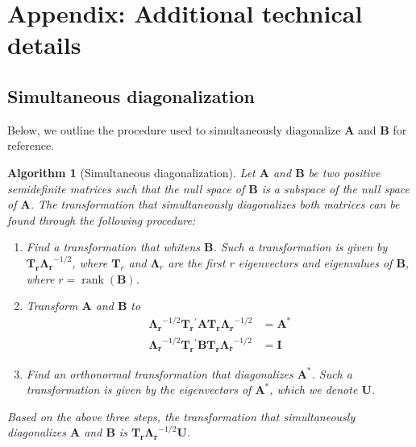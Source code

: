 \documentclass[12pt]{article} %
\newtheorem{algorithm}[theorem]{Algorithm}
\newcommand{\trans}{\ensuremath{^\prime}}
\DeclareMathOperator{\rank}{rank}
\begin{document}
\section{Appendix: Additional technical details}

\subsection{Simultaneous diagonalization}

Below, we outline the procedure used to simultaneously diagonalize $\bm{A}$ and $\bm{B}$ for reference.

\begin{algorithm}[Simultaneous diagonalization]
Let $\bm{A}$ and $\bm{B}$ be two positive semidefinite matrices such that the null space of $\bm{B}$ is a subspace of the null space of $\bm{A}$. The transformation that simultaneously diagonalizes both matrices can be found through the following procedure:
\begin{enumerate}
\item Find a transformation that whitens $\bm{B}$. Such a transformation is given by $\bm{T_r \Lambda_r}^{-1/2}$, where $\bm{T}_r$ and $\bm{\Lambda}_r$ are the first $r$  eigenvectors and eigenvalues of $\bm{B}$, where $r = \rank(\bm{B})$. 

\item Transform $\bm{A}$ and $\bm{B}$ to
\begin{align}
\bm{\Lambda_r}^{-1/2} \bm{T_r}\trans \bm{A T_r \Lambda_r}^{-1/2} &= \bm{A}^* \label{eq:astar} \\
\bm{\Lambda_r}^{-1/2} \bm{T_r}\trans \bm{B T_r \Lambda_r}^{-1/2} &= \bm{I}
\end{align}

\item Find an orthonormal transformation that diagonalizes $\bm{A}^*$. Such a transformation is given by the eigenvectors of $\bm{A}^*$, which we denote $\bm{U}$.
\end{enumerate}

\noindent
Based on the above three steps, the transformation that simultaneously diagonalizes $\bm{A}$ and $\bm{B}$ is $\bm{T_r \Lambda_r}^{-1/2} \bm{U}$.\\ 
\end{algorithm}
\end{document}
